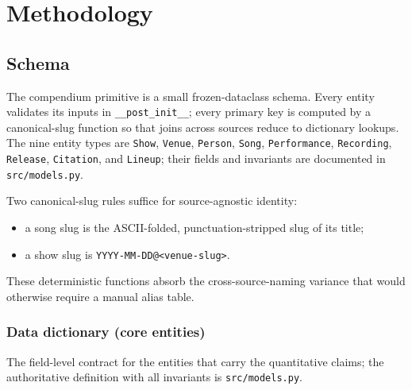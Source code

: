 \documentclass[
]{article}
\providecommand{\tightlist}{%
  \setlength{\itemsep}{0pt}\setlength{\parskip}{0pt}}
\begin{document}
\newpage

\section{Methodology}\label{methodology}

\subsection{Schema}\label{schema}

The compendium primitive is a small frozen-dataclass schema. Every
entity validates its inputs in \texttt{\_\_post\_init\_\_}; every
primary key is computed by a canonical-slug function so that joins
across sources reduce to dictionary lookups. The nine entity types are
\texttt{Show}, \texttt{Venue}, \texttt{Person}, \texttt{Song},
\texttt{Performance}, \texttt{Recording}, \texttt{Release},
\texttt{Citation}, and \texttt{Lineup}; their fields and invariants are
documented in \texttt{src/models.py}.

Two canonical-slug rules suffice for source-agnostic identity:

\begin{itemize}
\tightlist
\item
  a song slug is the ASCII-folded, punctuation-stripped slug of its
  title;
\item
  a show slug is
  \texttt{YYYY-MM-DD@\textless{}venue-slug\textgreater{}}.
\end{itemize}

These deterministic functions absorb the cross-source-naming variance
that would otherwise require a manual alias table.

\subsubsection{Data dictionary (core
entities)}\label{data-dictionary-core-entities}

The field-level contract for the entities that carry the quantitative
claims; the authoritative definition with all invariants is
\texttt{src/models.py}.
\end{document}

